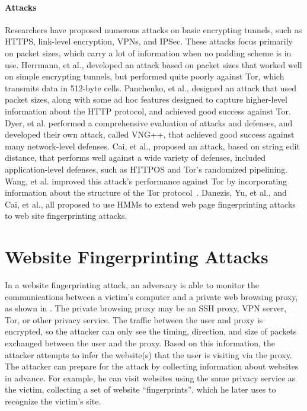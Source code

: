 \documentclass[10pt,journal]{IEEEtran}
\begin{document}
\paragraph*{Attacks}  Researchers have proposed numerous attacks on
basic encrypting tunnels, such as HTTPS, link-level encryption, VPNs,
and IPSec\cite{bissias-pets06, danezis-trafficanalysis, gong-ccs10,
  herrmann-ccsw09, hintz-pets02, liberatore-ccs06, lu-esorics10,
  sun-snp02, yu-tcj11, zhang-wisec11, dyer-snp12}.  These attacks
focus primarily on packet sizes, which carry a lot of information when
no padding scheme is in use.  Herrmann, et al., developed an attack
based on packet sizes that worked well on simple encrypting
tunnels\cite{herrmann-ccsw09}, but performed quite poorly against Tor,
which transmits data in 512-byte cells.  Panchenko, et al., designed
an attack that used packet sizes, along with some ad hoc features
designed to capture higher-level information about the HTTP protocol,
and achieved good success against Tor\cite{panchenko-wpes11}.  Dyer,
et al. performed a comprehensive evaluation of attacks and defenses,
and developed their own attack, called VNG++, that achieved good
success against many network-level defenses\cite{dyer-snp12}.  Cai, et
al., proposed an attack, based on string edit distance, that performs
well against a wide variety of defenses, included application-level
defenses, such as HTTPOS and Tor's randomized
pipelining\cite{cai-ccs12}.  Wang, et al. improved this attack's
performance against Tor by incorporating information about the
structure of the Tor protocol~\cite{wang-wpes13}.
Danezis, Yu, et al., and Cai, et al., all
proposed to use HMMs to extend web page fingerprinting attacks to web
site fingerprinting
attacks\cite{danezis-trafficanalysis,yu-tcj11,cai-ccs12}.

\section{Website Fingerprinting Attacks}
\label{sec:prob-description}

In a website fingerprinting attack, an adversary is able to monitor
the communications between a victim's computer and a private web
browsing proxy, as shown in .  The private browsing
proxy may be an SSH proxy, VPN server, Tor, or other privacy service.
The traffic between the user and proxy is encrypted, so the attacker
can only see the timing, direction, and size of packets exchanged
between the user and the proxy.  Based on this information, the
attacker attempts to infer the website(s) that the user is visiting
via the proxy.  The attacker can prepare for the attack by collecting
information about websites in advance.  For example, he can visit
websites using the same privacy service as the victim, collecting a
set of website ``fingerprints'', which he later uses to recognize the
victim's site.
\end{document}
